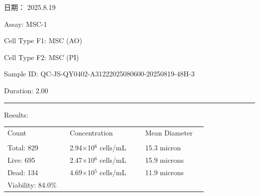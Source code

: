 \documentclass[UTF8,10pt,a4paper,fontset=fandol]{ctexart}
\newcommand{\fieldvalue}[1]{#1}
\newcommand{\handwritten}[1]{#1}
\begin{document}
\hfill 日期：
\fieldvalue{\handwritten{2025.8.19}}

\newpage

Assay: %
\fieldvalue{MSC-1}

\medskip

Cell Type F1: %
\fieldvalue{MSC (AO)}

Cell Type F2: %
\fieldvalue{MSC (PI)}

\medskip

Sample ID: %
\fieldvalue{QC-JS-QY0402-A31222025080600-20250819-48H-3}

Duration: %
\fieldvalue{2.00}

\medskip
\hrule
\medskip

Results:

\begin{center}
\begin{tabular}{@{}p{0.29\linewidth}p{0.34\linewidth}p{0.29\linewidth}@{}}
Count & Concentration & Mean Diameter \\
\underline{\hspace{0.75in}} &
\underline{\hspace{1.05in}} &
\underline{\hspace{1.05in}} \\[2pt]
\fieldvalue{Total: 829} &
\fieldvalue{2.94$\times$10$^{6}$ cells/mL} &
\fieldvalue{15.3 micron} \\

\fieldvalue{Live: 695} &
\fieldvalue{2.47$\times$10$^{6}$ cells/mL} &
\fieldvalue{15.9 microns} \\

\fieldvalue{Dead: 134} &
\fieldvalue{4.69$\times$10$^{5}$ cells/mL} &
\fieldvalue{11.9 microns} \\

\fieldvalue{Viability: 84.0\%} &
& 
\end{tabular}
\end{center}
\end{document}
